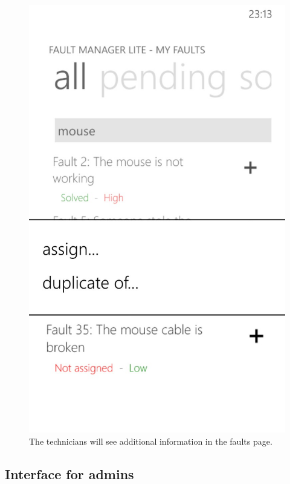 \documentclass{report}
\begin{document}
\begin{figure}[hbtp]
\begin{minipage}{0.3\textwidth}
\end{minipage}
\hspace{0.02\textwidth}
\begin{minipage}{0.3\textwidth}
\includegraphics[width=\textwidth]{img/TechAssign.jpg}
\end{minipage}
\caption{The technicians will see additional information in the faults page.}
\label{imgFaultLog}
\end{figure}

\subsection{Interface for admins}
\end{document}
